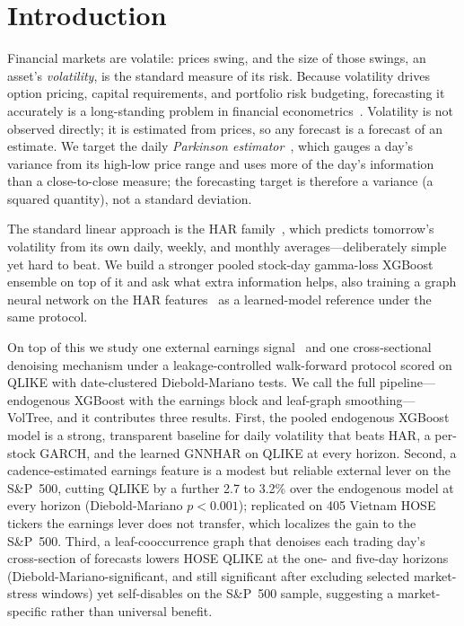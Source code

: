 \documentclass[runningheads,a4paper]{llncs}
\begin{document}
\section{Introduction}
Financial markets are volatile: prices swing, and the size of those swings, an asset's
\emph{volatility}, is the standard measure of its risk. Because volatility drives option
pricing, capital requirements, and portfolio risk budgeting, forecasting
it accurately is a long-standing problem in financial econometrics~\cite{corsi2009}. Volatility is
not observed directly; it is estimated from prices, so any forecast is a forecast of an estimate. We
target the daily \emph{Parkinson estimator}~\cite{parkinson1980}, which gauges a day's variance from
its high-low price range and uses more of the day's information than a close-to-close measure; the
forecasting target is therefore a variance (a squared quantity), not a standard deviation.

The standard linear approach is the HAR family~\cite{corsi2009}, which predicts
tomorrow's volatility from its own daily, weekly, and monthly averages---deliberately simple yet hard to
beat. We build a stronger pooled stock-day gamma-loss XGBoost ensemble on top of it and ask what extra
information helps, also training a graph neural network on the HAR features~\cite{gnnhar2024} as a
learned-model reference under the same protocol.

On top of this we study one external earnings signal~\cite{patell1981} and one cross-sectional denoising
mechanism under a leakage-controlled walk-forward protocol scored on QLIKE with date-clustered
Diebold-Mariano tests. We call the full pipeline---endogenous XGBoost with the earnings block and
leaf-graph smoothing---VolTree, and it contributes three results. First, the pooled endogenous XGBoost
model is a strong, transparent baseline for daily volatility that beats HAR, a per-stock GARCH, and the
learned GNNHAR on QLIKE at every horizon. Second, a
cadence-estimated earnings feature is a modest but reliable external lever on the S\&P~500, cutting QLIKE by
a further 2.7 to 3.2\% over the endogenous model at every horizon (Diebold-Mariano $p<0.001$); replicated on
405 Vietnam HOSE tickers the earnings lever does not transfer, which localizes the gain to the S\&P~500.
Third, a leaf-cooccurrence graph that denoises each trading day's cross-section of forecasts lowers HOSE
QLIKE at the one- and five-day horizons (Diebold-Mariano-significant, and still significant after excluding
selected market-stress windows) yet self-disables on the S\&P~500 sample, suggesting a market-specific
rather than universal benefit.
\end{document}
